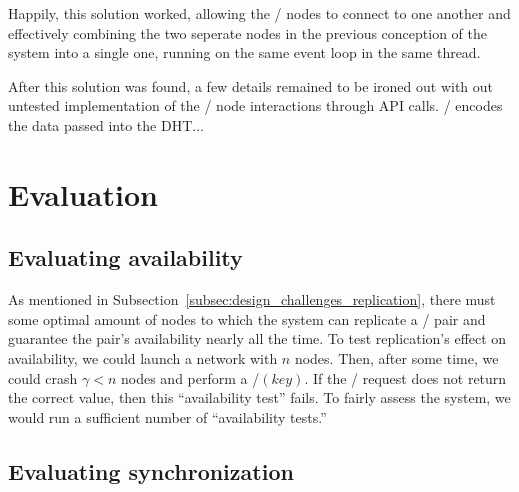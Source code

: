 \documentclass[11pt,twocolumn]{article}
\begin{document}
Happily, this solution worked, allowing the \Entangled/ nodes to connect to one another and effectively combining the two seperate nodes in the previous conception of the system into a single one, running on the same event loop in the same thread.

After this solution was found, a few details remained to be ironed out with out untested implementation of the \Entangled/ node interactions through API calls. \Entangled/ encodes the data passed into the DHT...






\section{Evaluation}
\label{sec:evaluation}

\subsection{Evaluating availability}
As mentioned in Subsection~\ref{subsec:design_challenges_replication}, there must some optimal amount of nodes to which the system can replicate a \kv/ pair and guarantee the pair's availability nearly all the time.
To test replication's effect on availability, we could launch a network with $n$ nodes.
Then, after some time, we could crash $\gamma < n$ nodes and perform a \findValue/$(key)$.
If the \findValue/ request does not return the correct value, then this ``availability test'' fails.
To fairly assess the system, we would run a sufficient number of ``availability tests.''

\subsection{Evaluating synchronization}











\end{document}
